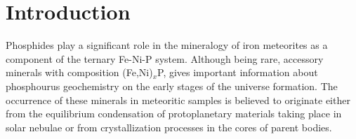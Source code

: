 \documentclass[twoside,twocolumn,9pt]{article}
\begin{document}




\section{Introduction}

Phosphides play a significant role in the mineralogy of iron meteorites as a component of the ternary Fe-Ni-P system. 
Although being rare, accessory minerals  with  composition  (Fe,Ni)$_x$P, gives important information about phosphourus geochemistry on the early stages of the universe formation. \cite{Skala2005, skala_m-2003, Buseck1969, Britvin-2002, Pratesi-2006, reed_1968, Britvin2019-SciRep, Britvin2019-PCM-Fe2P, Britvin2019-murashkoite-MP-FeP, Britvin2020-Halamishite}
The occurrence  of  these  minerals  in  meteoritic  samples  is  believed  to originate either from the equilibrium condensation of protoplanetary materials  taking  place  in  solar nebulae  or  from  crystallization processes  in  the  cores  of  parent  bodies. 
\end{document}
